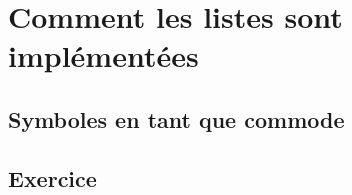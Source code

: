 \chapter{Comment les listes sont implémentées}

\section{Symboles en tant que commode}

\section{Exercice}
